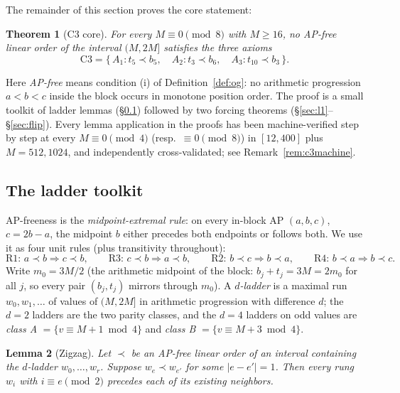 \documentclass[11pt]{article}
\newtheorem{theorem}{Theorem}
\newtheorem{lemma}[theorem]{Lemma}
\theoremstyle{definition}
\begin{document}
The remainder of this section proves the core statement:

\begin{theorem}[C3 core]\label{thm:c3core}
For every $M \equiv 0 \pmod 8$ with $M \ge 16$, no AP-free linear order
of the interval $(M, 2M]$ satisfies the three axioms
\[
\mathrm{C3} = \{\, A_1\colon t_5 \prec b_5,\quad
A_2\colon t_3 \prec b_6,\quad A_3\colon t_{10} \prec b_3 \,\}.
\]
\end{theorem}

Here \emph{AP-free} means condition (i) of Definition~\ref{def:og}: no
arithmetic progression $a<b<c$ inside the block occurs in monotone
position order. The proof is a small toolkit of ladder lemmas
(\S\ref{sec:toolkit}) followed by two forcing theorems
(\S\ref{sec:l1}--\S\ref{sec:flip}). Every lemma application in the
proofs has been machine-verified step by step at every
$M \equiv 0 \pmod 4$ (resp.\ $\equiv 0 \pmod 8$) in $[12, 400]$ plus
$M = 512, 1024$, and independently cross-validated; see
Remark~\ref{rem:c3machine}.

\subsection{The ladder toolkit}\label{sec:toolkit}

AP-freeness is the \emph{midpoint-extremal rule}: on every in-block AP
$(a, b, c)$, $c = 2b - a$, the midpoint $b$ either precedes both
endpoints or follows both. We use it as four unit rules (plus
transitivity throughout):
\[
\text{R1: } a \prec b \Rightarrow c \prec b, \qquad
\text{R3: } c \prec b \Rightarrow a \prec b, \qquad
\text{R2: } b \prec c \Rightarrow b \prec a, \qquad
\text{R4: } b \prec a \Rightarrow b \prec c.
\]
Write $m_0 = 3M/2$ (the arithmetic midpoint of the block: $b_j + t_j =
3M = 2m_0$ for all $j$, so every pair $(b_j, t_j)$ mirrors through
$m_0$). A \emph{$d$-ladder} is a maximal run $w_0, w_1, \dots$ of
values of $(M, 2M]$ in arithmetic progression with difference $d$; the
$d = 2$ ladders are the two parity classes, and the $d = 4$ ladders on
odd values are \emph{class A} $= \{v \equiv M + 1 \bmod 4\}$ and
\emph{class B} $= \{v \equiv M + 3 \bmod 4\}$.

\begin{lemma}[Zigzag]\label{lem:zigzag}
Let $\prec$ be an AP-free linear order of an interval containing the
$d$-ladder $w_0, \dots, w_r$. Suppose $w_e \prec w_{e'}$ for some
$|e - e'| = 1$. Then every rung $w_i$ with $i \equiv e \pmod 2$ precedes
each of its existing neighbors.
\end{lemma}
\end{document}
